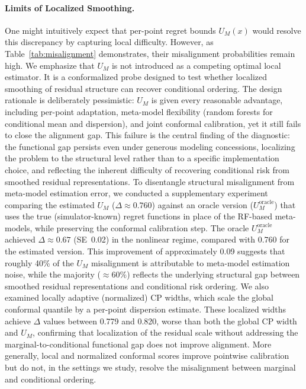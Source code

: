 \documentclass[a4paper,11pt]{article}
\begin{document}
\paragraph{Limits of Localized Smoothing.}
\label{sec:limits-of-smoothing}
One might intuitively expect that per-point regret bounds $U_M(x)$ would resolve this discrepancy by capturing local difficulty. However, as Table~\ref{tab:misalignment} demonstrates, their misalignment probabilities remain high. We emphasize that $U_M$ is not introduced as a competing optimal local estimator. It is a conformalized probe designed to test whether localized smoothing of residual structure can recover conditional ordering. The design rationale is deliberately pessimistic: $U_M$ is given every reasonable advantage, including per-point adaptation, meta-model flexibility (random forests for conditional mean and dispersion), and joint conformal calibration, yet it still fails to close the alignment gap. This failure is the central finding of the diagnostic: the functional gap persists even under generous modeling concessions, localizing the problem to the structural level rather than to a specific implementation choice, and reflecting the inherent difficulty of recovering conditional risk from smoothed residual representations. To disentangle structural misalignment from meta-model estimation error, we conducted a supplementary experiment comparing the estimated $U_M$ ($\Delta \approx 0.760$) against an oracle version ($U_M^{\text{oracle}}$) that uses the true (simulator-known) regret functions in place of the RF-based meta-models, while preserving the conformal calibration step. The oracle $U_M^{\text{oracle}}$ achieved $\Delta \approx 0.67$ (SE~0.02) in the nonlinear regime, compared with 0.760 for the estimated version. This improvement of approximately 0.09 suggests that roughly 40\% of the $U_M$ misalignment is attributable to meta-model estimation noise, while the majority ($\approx 60\%$) reflects the underlying structural gap between smoothed residual representations and conditional risk ordering. We also examined locally adaptive (normalized) CP widths, which scale the global conformal quantile by a per-point dispersion estimate. These localized widths achieve $\Delta$ values between 0.779 and 0.820, worse than both the global CP width and $U_M$, confirming that localization of the residual scale without addressing the marginal-to-conditional functional gap does not improve alignment. More generally, local and normalized conformal scores improve pointwise calibration but do not, in the settings we study, resolve the misalignment between marginal and conditional ordering.
\end{document}
